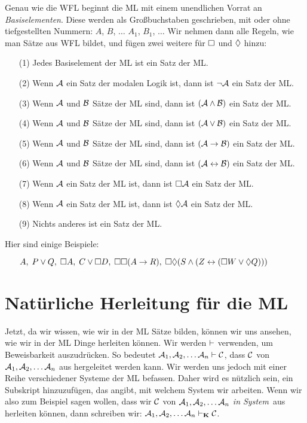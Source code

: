 Genau wie die WFL beginnt die ML mit einem unendlichen Vorrat an \emph{Basiselementen}. Diese werden als Großbuchstaben geschrieben, mit oder ohne tiefgestellten Nummern: $A$, $B$, $\dots$ $A_1$, $B_1$, $\dots$ Wir nehmen dann alle Regeln, wie man Sätze aus WFL bildet, und fügen zwei weitere für $\Box$ und $\Diamond$ hinzu:
\begin{itemize}
	\item[(1)]Jedes Basiselement der ML ist ein Satz der ML.
	\item[(2)]Wenn $\mathcal{A}$ ein Satz der modalen Logik ist, dann ist $\neg\mathcal{A}$ ein Satz der ML.
	\item[(3)]Wenn $\mathcal{A}$ und $\mathcal{B}$ Sätze der ML sind, dann ist $(\mathcal{A}\wedge\mathcal{B})$ ein Satz der ML.
	\item[(4)]Wenn $\mathcal{A}$ und $\mathcal{B}$ Sätze der ML sind, dann ist $(\mathcal{A}\vee\mathcal{B})$ ein Satz der ML.
	\item[(5)]Wenn $\mathcal{A}$ und $\mathcal{B}$ Sätze der ML sind, dann ist $(\mathcal{A}\rightarrow\mathcal{B})$ ein Satz der ML.
	\item[(6)]Wenn $\mathcal{A}$ und $\mathcal{B}$ Sätze der ML sind, dann ist $(\mathcal{A}\leftrightarrow\mathcal{B})$ ein Satz der ML.
	\item[(7)]Wenn $\mathcal{A}$ ein Satz der ML ist, dann ist $\Box\mathcal{A}$ ein Satz der ML.
	\item[(8)]Wenn $\mathcal{A}$ ein Satz der ML ist, dann ist $\Diamond\mathcal{A}$ ein Satz der ML.
	\item[(9)]Nichts anderes ist ein Satz der ML.
\end{itemize}
Hier sind einige Beispiele:
\begin{itemize}
	\item[]$A,\;P\vee Q,\;\Box A,\;C\vee \Box D,\;\Box\Box (A\rightarrow R),\;\Box\Diamond (S\wedge (Z\leftrightarrow (\Box W \vee \Diamond Q)))$
\end{itemize}

\chapter{Natürliche Herleitung für die ML}
\label{Proof}

Jetzt, da wir wissen, wie wir in der ML Sätze bilden, können wir uns ansehen, wie wir in der ML Dinge herleiten können. Wir werden $\vdash$ verwenden, um Beweisbarkeit auszudrücken. So bedeutet $\mathcal{A}_1,\mathcal{A}_2, \dots \mathcal{A}_n \vdash \mathcal{C}$, dass $\mathcal{C}$ von $\mathcal{A}_1,\mathcal{A}_2, \dots \mathcal{A}_n$ aus hergeleitet werden kann. Wir werden uns jedoch mit einer Reihe verschiedener Systeme der ML befassen. Daher wird es nützlich sein, ein Subskript hinzuzufügen, das angibt, mit welchem System wir arbeiten. Wenn wir also zum Beispiel sagen wollen, dass wir $\mathcal{C}$ von $\mathcal{A}_1,\mathcal{A}_2, \dots \mathcal{A}_n$ \emph{in System}~\mlK aus herleiten können, dann schreiben wir: $\mathcal{A}_1,\mathcal{A}_2, \dots \mathcal{A}_n \vdash_{\mathbf{K}} \mathcal{C}$.

